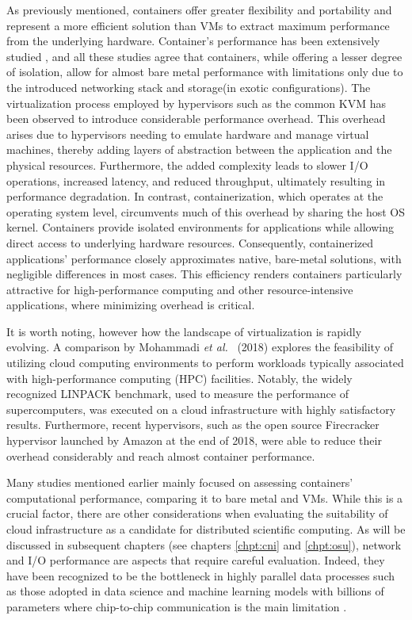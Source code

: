 As previously mentioned, containers offer greater flexibility and portability
and represent a more efficient solution than VMs to extract maximum performance
from the underlying hardware.
Container's performance has been extensively studied
\cite{deochake2023,Li2023,Sharma2016,Felter_2015}, and all these studies agree
that containers, while offering a lesser degree of isolation, allow for almost
bare metal performance with limitations only due to the introduced networking
stack and storage(in exotic configurations).
The virtualization process employed by hypervisors such as the common
KVM\cite{Kivity_2007} has been observed to introduce considerable performance
overhead. This overhead arises due to hypervisors needing to emulate hardware
and manage virtual machines, thereby adding layers of abstraction between the
application and the physical resources. Furthermore, the added complexity leads
to slower I/O operations, increased latency, and reduced throughput, ultimately
resulting in performance degradation.
In contrast, containerization, which operates at the operating system level,
circumvents much of this overhead by sharing the host OS kernel. Containers
provide isolated environments for applications while allowing direct access to
underlying hardware resources.
Consequently, containerized applications' performance closely approximates
native, bare-metal solutions, with negligible differences in most cases.
This efficiency renders containers particularly attractive for high-performance
computing and other resource-intensive applications, where minimizing overhead
is critical.

It is worth noting, however how the landscape of virtualization is rapidly
evolving.
A comparison by Mohammadi \emph{et al.}~\cite{Mohammadi2018} (2018) explores the
feasibility of utilizing cloud computing environments to perform workloads
typically associated with high-performance computing (HPC) facilities.
Notably, the widely recognized LINPACK benchmark, used to measure the
performance of supercomputers, was executed on a cloud infrastructure with
highly satisfactory results.
Furthermore, recent hypervisors, such as the open source Firecracker hypervisor
launched by Amazon at the end of 2018, were able to reduce their overhead
considerably and reach almost container performance\cite{Li_2023}.

Many studies mentioned earlier mainly focused on assessing containers'
computational performance, comparing it to bare metal and VMs.
While this is a crucial factor, there are other considerations when evaluating
the suitability of cloud infrastructure as a candidate for distributed
scientific computing.
As will be discussed in subsequent chapters (see chapters \ref{chpt:cni} and
\ref{chpt:osu}), network and I/O performance are aspects that require careful
evaluation.
Indeed, they have been recognized to be the bottleneck in highly parallel data
processes such as those adopted in data science and machine learning models with
billions of parameters where chip-to-chip communication is the main limitation
\cite{Pope_2023}.


